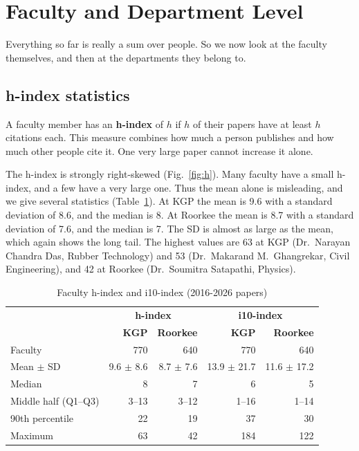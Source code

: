 \documentclass[conference,10pt]{IEEEtran}
\begin{document}
\section{Faculty and Department Level}\label{sec:fac}
Everything so far is really a sum over people. So we now look at the faculty themselves, and then at the departments
they belong to.

\subsection{h-index statistics}
A faculty member has an \textbf{h-index} of $h$ if $h$ of their papers have at least $h$ citations each. This measure
combines how much a person publishes and how much other people cite it. One very large paper cannot increase it alone.

The h-index is strongly right-skewed (Fig.~\ref{fig:h}). Many faculty have a small h-index, and a few have a very large
one. Thus the mean alone is misleading, and we give several statistics (Table~\ref{tab:hstats}). At KGP the mean is
9.6 with a standard deviation of 8.6, and the median is 8. At Roorkee the mean is 8.7 with a standard deviation of 7.6,
and the median is 7. The SD is almost as large as the mean, which again shows the long tail. The highest values are 63
at KGP (Dr.~Narayan Chandra Das, Rubber Technology) and 53 (Dr.~Makarand M.\ Ghangrekar, Civil Engineering), and 42 at
Roorkee (Dr.~Soumitra Satapathi, Physics).

\begin{table}[!t]
\centering
\caption{Faculty h-index and i10-index (2016-2026 papers)}
\label{tab:hstats}
\footnotesize
\setlength{\tabcolsep}{3pt}
\begin{tabular}{@{}lrrrr@{}}
\toprule
 & \multicolumn{2}{c}{\textbf{h-index}} & \multicolumn{2}{c}{\textbf{i10-index}} \\
 & \textbf{KGP} & \textbf{Roorkee} & \textbf{KGP} & \textbf{Roorkee} \\
\midrule
Faculty & 770 & 640 & 770 & 640 \\
Mean $\pm$ SD & 9.6 $\pm$ 8.6 & 8.7 $\pm$ 7.6 & 13.9 $\pm$ 21.7 & 11.6 $\pm$ 17.2 \\
Median & 8 & 7 & 6 & 5 \\
Middle half (Q1--Q3) & 3--13 & 3--12 & 1--16 & 1--14 \\
90th percentile & 22 & 19 & 37 & 30 \\
Maximum & 63 & 42 & 184 & 122 \\
\bottomrule
\end{tabular}
\end{table}
\end{document}
